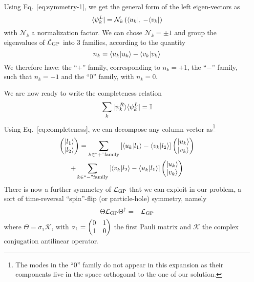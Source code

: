 Using Eq.~\eqref{eq:symmetry-1}, we get the general form of the left
eigen-vectors as
%
\begin{equation}\label{eq:psi-L}
  \langle \psi_k^L \vert = \mathcal{N}_k \left( \langle u_k \vert,\, -\langle v_k \vert \right)
\end{equation}
% 
with $\mathcal{N}_k$ a normalization factor.  We can chose
$\mathcal{N}_k = \pm 1$ and group the eigenvalues of $\mathcal{L}_{\text{GP}}$
into 3 families, according to the quantity
%
\begin{equation}\label{eq:norms}
  n_k = \langle u_k \vert u_k \rangle - \langle v_k \vert v_k \rangle
\end{equation}
% 
We therefore have: the ``$+$'' family, corresponding to $n_k=+1$, the
``$-$'' family, such that $n_k=-1$ and the ``$0$'' family, with
$n_k=0$.


We are now ready to write the completeness relation
%
\begin{equation}\label{eq:completeness}
  \sum_k \vert \psi_k^R \rangle \langle \psi_k^L \vert = \mathbb{I}
\end{equation}
% 
Using Eq.~\eqref{eq:completeness}, we can decompose any column vector
as\footnote{The modes in the ``$0$'' family do not appear in this
  expansion as their components live in the space orthogonal to the one
  of our solution.}
%
\begin{multline}\label{eq:decomposition}
  \begin{pmatrix} \vert l_1 \rangle\\ \vert l_2 \rangle \end{pmatrix} = \sum_{k \in ``+" \mbox{\scriptsize family}} \left[\langle u_k \vert l_1 \rangle - \langle v_k \vert l_2 \rangle\right]\begin{pmatrix} \vert u_k \rangle\\ \vert v_k \rangle \end{pmatrix}\\
  + \sum_{k \in ``-" \mbox{\scriptsize family}} \left[\langle v_k \vert l_2 \rangle - \langle u_k \vert l_1 \rangle\right]\begin{pmatrix} \vert u_k \rangle\\ \vert v_k \rangle \end{pmatrix}
\end{multline}
% 
There is now a further symmetry of $\mathcal{L}_{\text{GP}}$ that we can
exploit in our problem, a sort of time-reversal ``spin''-flip (or
particle-hole) symmetry, namely
%
\begin{equation}\label{eq:symmetry-2}
   \Theta \mathcal{L}_{\text{GP}} \Theta^{\dagger} = -\mathcal{L}_{\text{GP}}
\end{equation}
%
where $\Theta = \sigma_1 \mathcal{K}$, with $\sigma_1 = \begin{pmatrix} 0 & 1\\ 1 & 0 \end{pmatrix}$
the first Pauli matrix and $\mathcal{K}$ the complex conjugation
antilinear operator.

